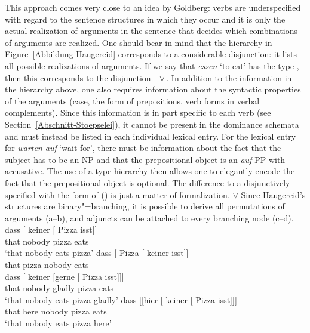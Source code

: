 \begin{exe}
\begin{xlist}[iv.]
\begin{exe}
\begin{xlist}[iv.]
This approach comes very close to an idea by Goldberg: verbs are underspecified with regard to the sentence structures in which they occur and
it is only the actual realization of arguments in the sentence that decides which combinations of arguments are realized.
One should bear in mind that the hierarchy in Figure~\ref{Abbildung-Haugereid} corresponds to a considerable disjunction:
it lists all possible realizations of arguments. If we say that \emph{essen} `to eat' has the type , then this
corresponds to the disjunction \,~$\vee$\,. In addition to the information in the hierarchy above, one also requires information about the syntactic properties of
the arguments (case, the form of prepositions, verb forms in verbal complements). Since this information is in part specific to each verb
(see Section~\ref{Abschnitt-Stoepselei}), it cannot be present in the dominance schemata and must instead be listed in each individual
lexical entry. For the lexical entry for \emph{warten auf} `wait for', there must be information about the fact that the subject has to be an
NP and that the prepositional object is an \emph{auf}-PP with accusative. The use of a type hierarchy then allows one to elegantly encode
the fact that the prepositional object is optional. The difference to a disjunctively specified
\compsl with the form of () is just a matter of formalization.
\ea
\comps {} $\vee$ 
\z
%
Since Haugereid's structures are binary"=branching, it is possible to derive all permutations of arguments (a--b), and adjuncts can be
attached to every branching node (c--d). 
\eal
\ex 
\gll dass [ keiner [ Pizza isst]]\\
     that {} nobody {} pizza eats\\
\glt `that nobody eats pizza'
\ex 
\gll dass [ Pizza [ keiner isst]]\\
	 that {} pizza {} nobody eats\\
\ex 
\gll dass [ keiner [gerne [ Pizza isst]]]\\
	 that {} nobody \spacebr{}gladly {} pizza eats\\
\glt `that nobody eats pizza gladly'
\ex 
\gll dass [[hier              [ keiner [ Pizza isst]]]\\
     that \hspaceThis{[[}here {}          nobody {} pizza eats\\
\glt `that nobody eats pizza here'

\end{xlist}
\end{exe}
\end{xlist}
\end{exe}
